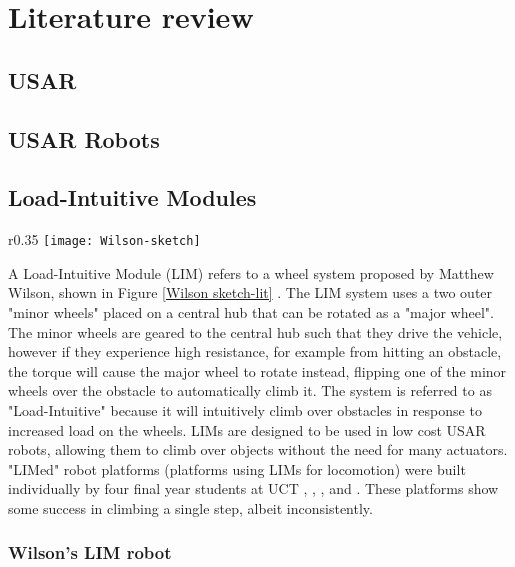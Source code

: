  \chapter{Literature review}

\section{USAR}

\section{USAR Robots}

\section{Load-Intuitive Modules} %

\begin{wrapfigure}{r}{0.35\textwidth} %
	\centering
	\texttt{[image: Wilson-sketch]}
	\caption{Systems layout of Wilson's LIM device \citep{Wilson-2013}}
	\label{Wilson sketch-lit}
\end{wrapfigure}

A Load-Intuitive Module (LIM) refers to a wheel system proposed by Matthew Wilson, shown in Figure \ref{Wilson sketch-lit} \citep{Wilson-2013}. The LIM system uses a two outer "minor wheels" placed on a central hub that can be rotated as a "major wheel". The minor wheels are geared to the central hub such that they drive the vehicle, however if they experience high resistance, for example from hitting an obstacle, the torque will cause the major wheel to rotate instead, flipping one of the minor wheels over the obstacle to automatically climb it. The system is referred to as "Load-Intuitive" because it will intuitively climb over obstacles in response to increased load on the wheels. LIMs are designed to be used in low cost USAR robots, allowing them to climb over objects without the need for many actuators.\\

\noindent "LIMed" robot platforms (platforms using LIMs for locomotion) were built individually by four final year students at UCT \citep{Wilson-2013},  \citep{Haskel-2017}, \citep{Buchanan-2018}, and \citep{Powrie-2019}. These platforms show some success in climbing a single step, albeit inconsistently.
\newpage

\subsection{Wilson's LIM robot} %

